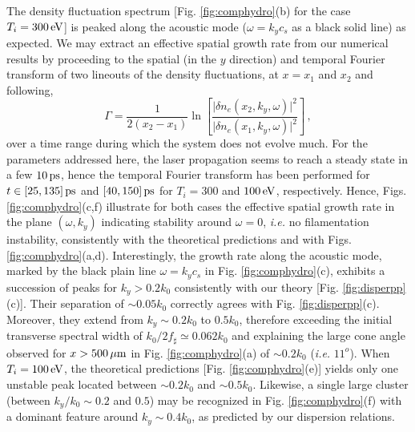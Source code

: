 \documentclass[
 reprint,
 superscriptaddress,
 amsmath,amssymb,
 aps,
]{revtex4-1}
\begin{document}
The   density fluctuation spectrum [Fig.  \ref{fig:comphydro}(b) for the case $T_i=300\,\rm eV$] is peaked along the acoustic mode ($\omega=k_yc_s$ as a black solid line) as expected. We may extract an effective spatial growth rate from our numerical results by proceeding to the spatial (in the $y$ direction) and temporal Fourier transform of two lineouts of the density fluctuations, at $x=x_1$ and $x_2$ and following,
\begin{equation}
    \Gamma = \frac{1}{2(x_2-x_1)} \ln \left[\frac{\vert \delta n_e(x_2,k_y,\omega)\vert^2}{\vert \delta n_e(x_1,k_y,\omega)\vert^2}\right] \, , \label{eq:gammah}
\end{equation}
over a time range during which the system does not evolve much. 
For the parameters addressed here, the laser propagation seems to  reach a steady state in a few $10\,\rm ps$, hence the temporal Fourier transform has been performed for $t\in [25,135]\,\rm ps$ and  $[40,150]\,\rm ps$ for  $T_i=300$ and $100\, \rm eV$, respectively. 
Hence, Figs.  \ref{fig:comphydro}(c,f) illustrate for both cases  the effective spatial growth rate  in the plane $(\omega,k_y)$ indicating stability around $\omega=0$, \emph{i.e.} no filamentation instability, consistently with the theoretical predictions and with Figs. \ref{fig:comphydro}(a,d). 
Interestingly, the growth rate along the acoustic mode, marked by the black plain line $\omega=k_yc_s$ in Fig. \ref{fig:comphydro}(c), exhibits a succession of peaks for $k_y>0.2k_0$ consistently with our theory [Fig. \ref{fig:disperpp}(c)]. Their separation of $\sim 0.05 k_0$ correctly agrees with Fig. \ref{fig:disperpp}(c). Moreover, they extend from $k_y \sim  0.2k_0$  to $0.5k_0$, therefore exceeding the initial transverse spectral width of $k_0/2f_\sharp  \simeq 0.062k_0$ and  explaining the large cone angle   observed for $x>500\,\rm\mu m$ in Fig. \ref{fig:comphydro}(a) of $\sim 0.2k_0$ (\emph{i.e.} $11^o$).
When $T_i=100\, \rm eV$, the theoretical predictions [Fig. \ref{fig:comphydro}(e)] yields only one unstable peak located between $\sim 0.2k_0$ and $\sim 0.5k_0$. Likewise, a single large cluster (between  $k_y/k_0\sim0.2$ and $0.5$) may be recognized  in Fig. \ref{fig:comphydro}(f) with a dominant feature around $k_y\sim 0.4k_0$, as predicted by our dispersion relations.
\end{document}
